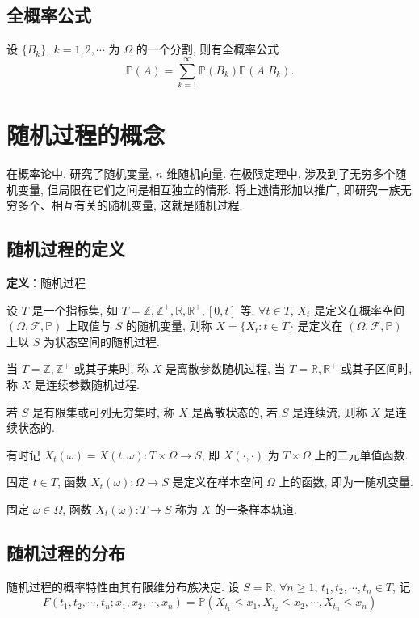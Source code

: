 \documentclass[openany]{ctexbook}
\theoremstyle{kaiti}
\theoremstyle{normal}
\begin{document}
\subsection{全概率公式}

设 $\{B_k\},~k=1,2,\cdots$ 为 $\Omega$ 的一个分割, 则有全概率公式
\begin{equation}
  \mathbb{P}(A)=\sum_{k=1}^\infty \mathbb{P}(B_k)\mathbb{P}(A|B_k).
\end{equation}

\section{随机过程的概念}

在概率论中, 研究了随机变量, $n$ 维随机向量. 在极限定理中, 涉及到了无穷多个随机变量, 但局限在它们之间是相互独立的情形. 将上述情形加以推广, 即研究一族无穷多个、相互有关的随机变量, 这就是随机过程.

\subsection{随机过程的定义}

\textbf{定义}：随机过程

设 $T$ 是一个指标集, 如 $T=\mathbb{Z},\mathbb{Z}^+,\mathbb{R},\mathbb{R}^+,[0,t]$ 等. $\forall t\in T$, $X_t$ 是定义在概率空间 $(\Omega,\mathcal{F},\mathbb{P})$ 上取值与 $S$ 的随机变量, 则称 $X=\{X_t:t\in T\}$ 是定义在 $(\Omega,\mathcal{F},\mathbb{P})$ 上以 $S$ 为状态空间的随机过程.

当 $T=\mathbb{Z},\mathbb{Z}^+$ 或其子集时, 称 $X$ 是离散参数随机过程, 当 $T=\mathbb{R},\mathbb{R}^+$ 或其子区间时, 称 $X$ 是连续参数随机过程. 

若 $S$ 是有限集或可列无穷集时, 称 $X$ 是离散状态的, 若 $S$ 是连续流, 则称 $X$ 是连续状态的.

有时记 $X_t(\omega)=X(t,\omega):T\times\Omega\to S$, 即 $X(\cdot,\cdot)$ 为 $T\times\Omega$ 上的二元单值函数. 

固定 $t\in T$, 函数 $X_t(\omega):\Omega\to S$ 是定义在样本空间 $\Omega$ 上的函数, 即为一随机变量.

固定 $\omega\in\Omega$, 函数 $X_t(\omega):T\to S$ 称为 $X$ 的一条样本轨道. 

\subsection{随机过程的分布}

随机过程的概率特性由其有限维分布族决定. 设 $S=\mathbb{R}$, $\forall n\geqslant1$, $t_1,t_2,\cdots,t_n\in T$, 记
\begin{equation}
  F(t_1,t_2,\cdots,t_n;x_1,x_2,\cdots,x_n)=\mathbb{P}(X_{t_1}\leqslant x_1,X_{t_2}\leqslant x_2,\cdots,X_{t_n}\leqslant x_n)
\end{equation}
\end{document}
